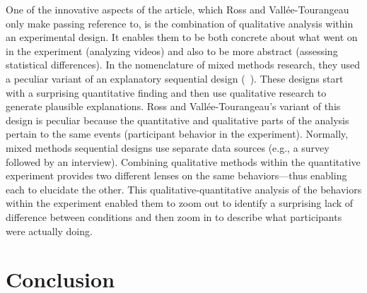 \documentclass[twocolumn, issue, reflection, authordate]{jote-new-article}
\begin{document}
One of the innovative aspects of the article, which Ross and
Vallée-Tourangeau only make passing reference to, is the combination of
qualitative analysis within an experimental design. It enables them to
be both concrete about what went on in the experiment (analyzing videos)
and also to be more abstract (assessing statistical differences). In the
nomenclature of mixed methods research, they used a peculiar variant of
an explanatory sequential design (~\citeyear{Creswell2018}). These
designs start with a surprising quantitative finding and then use
qualitative research to generate plausible explanations. Ross and
Vallée-Tourangeau's variant of this design is peculiar because the
quantitative and qualitative parts of the analysis pertain to the same
events (participant behavior in the experiment). Normally, mixed methods
sequential designs use separate data sources (e.g., a survey followed by
an interview). Combining qualitative methods within the quantitative
experiment provides two different lenses on the same behaviors—thus
enabling each to elucidate the other. This qualitative-quantitative
analysis of the behaviors within the experiment enabled them to zoom out
to identify a surprising lack of difference between conditions and then
zoom in to describe what participants were actually doing.

\section*{Conclusion}
\end{document}
